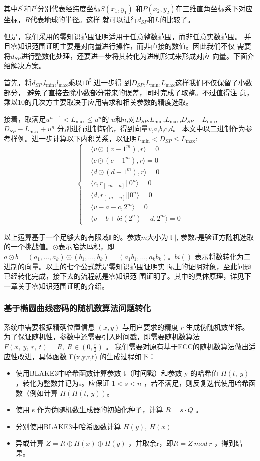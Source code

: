 \documentclass[zihao=-4]{ctexart}
\begin{document}
其中$S^{\prime}$和$P^{\prime}$分别代表经纬度坐标$S(x_1,y_1)$
和$P(x_2,y_2)$在三维直角坐标系下对应坐标，$R$代表地球的半径。这样
就可以进行$d_{SP}$和$L$的比较了。\par
但是，我们采用的零知识范围证明适用于任意整数范围，而非任意实数范围。
并且零知识范围证明主要是对向量进行操作，而非直接的数值。因此我们不仅
需要将$d_{SP}$进行整数化处理，还要进一步将其转化为进制形式来形成对应
向量。下面介绍解决方案。\par
首先，将$d_{SP}$,$l_{\min}$,$l_{\max}$乘以$10^5$,进一步得
到$D_{SP}$,$L_{\min}$,$L_{\max}$这样我们不仅保留了小数部分，
避免了直接去除小数部分带来的误差，同时完成了取整。不过值得注
意，乘以$10$的几次方主要取决于应用需求和相关参数的精度选取。\par
接着，取满足$u^{n-1}<L_{\max}\leq u^n$的
$u$和$n$,对$D_{SP}$,$L_{\min}$,$L_{\max}$,$D_{SP}-L_{\min}$,$D_{SP}-L_{\max}+u^n$
分别进行进制转化，得到向量$v$,$a$,$b$,$c$,$d$。
本文中以二进制作为参考样例。进一步计算以下内积关系，以证明$L_{\min}< D_{SP}\leq L_{\max}$:
\begin{equation}
  \begin{cases}
    &\langle v\odot(v-1^m),r\rangle=0\\
    &\langle c\odot(c-1^m),r\rangle=0\\
    &\langle d\odot(d-1^m),r\rangle=0\\
    &\langle c,r_{[:m-n]}||0^n\rangle=0\\
    &\langle d,r_{[:m-n]}||0^n\rangle=0\\
    &\langle v-a-c,2^m\rangle=0\\
    &\langle v-b+bi(2^n)-d,2^m\rangle=0
  \end{cases}
\end{equation}
\par
以上运算基于一个足够大的有限域$\mathbb{F}$的。参数$m$大小为$|\mathbb{F}|$,
参数$r$是验证方随机选取的一个挑战值。$\odot$表示哈达玛积，即
$a\odot b=(a_1,\ldots,a_k)\odot(b_1,\ldots,b_k)=(a_1b_1,\ldots,a_kb_k)$。$bi()$
表示将数转化为二进制的向量。以上的七个公式就是零知识范围证明实
际上的证明对象，至此问题已经转化完成，接下去的流程就是零知识范
围证明了。其中的具体原理，详见下一章关于零知识范围证明的介绍。
\subsubsection{基于椭圆曲线密码的随机数算法问题转化}
系统中需要根据精确位置信息 $(x,y)$ 与用户要求的精度 $r$ 生成伪随机数坐标。为了保证随机性，参数中还需要引入时间戳，即需要随机数算法 $F(x,\ y,\ r,\ t)=R,\ R\in (0,\frac{r}{2})$ 。
我们需要对原有基于ECC的随机数算法做出适应性改进，具体函数 F(x,y,r,t) 的生成过程如下：
\begin{itemize}
  \item 使用BLAKE3中哈希函数计算参数 t（时间戳）和参数 y 的哈希值 $H(t,\ y)$ ，转化为整数并记为s。应保证 $1<s<n$ ，若不满足，则反复迭代使用哈希函数（例如计算 $H(H(t,\ y))$。
  \item 使用 s 作为伪随机数生成器的初始化种子，计算 $R=s\cdot Q$ 。
  \item 分别使用BLAKE3中哈希函数计算 $H(y),\ H(x)$
  \item 异或计算 $Z=R\oplus H(x)\oplus H(y)$ ，并取余r，即$R=Z\ mod\ r$ ，得到结果。
\end{itemize}
\end{document}
